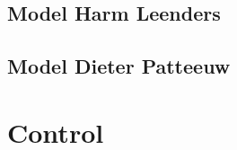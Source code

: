 \subsection{Model Harm Leenders}

\subsection{Model Dieter Patteeuw}

\section{Control}


%









